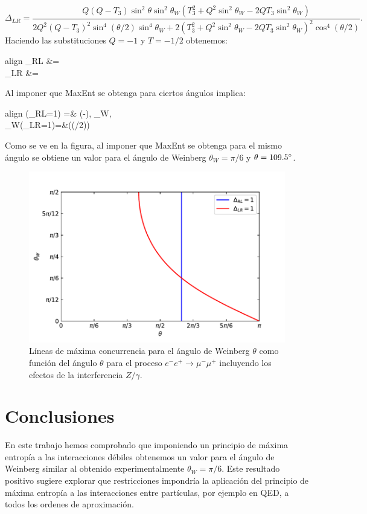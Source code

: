 \documentclass{article}
\theoremstyle{plain}
\theoremstyle{definition}
\begin{document}
	\[\Delta_{LR}=\frac{Q(Q-T_3)\sin^2\theta\sin^2\theta_W\left(T_3^2+Q^2\sin^2\theta_W-2QT_3\sin^2\theta_W\right)}{2Q^2(Q-T_3)^2\sin^4(\theta/2)\sin^4\theta_W + 2\left(T_3^2+Q^2\sin^2\theta_W-2QT_3\sin^2\theta_W\right)^2\cos^4(\theta/2)} \text{.} \]
	Haciendo las substituciones \(Q=-1\) y \(T=-1/2\) obtenemos:
	\begin{empheq}{align}
	\Delta_{RL} &= \nonumber\\
	\Delta_{LR} &= \nonumber
	\end{empheq}

	Al imponer que MaxEnt se obtenga para ciertos ángulos implica:
	\begin{empheq}{align}
	\theta(\Delta_{RL}=1) =& \arccos\left(-\right), \forall \theta_W, \\
\theta_W(\Delta_{LR}=1)=&\arcsin\left(\cot(\theta/2)\right)
	\end{empheq}
	
	Como se ve en la figura, al imponer que MaxEnt se obtenga para el mismo ángulo se obtiene un valor para el ángulo de Weinberg \(\theta_W = \pi/6 \) y \(\theta=109.5\degree \).
	\begin{figure}[h]
		\centering
		\includegraphics[width=0.85\linewidth]{concurrence.pdf}
		\caption{Líneas de máxima concurrencia para el ángulo de Weinberg \(\theta\) como función del ángulo \(\theta\) para el proceso \(e^-e^+\rightarrow\mu^-\mu^+\) incluyendo los efectos de la interferencia \(Z/\gamma\).} 
	\end{figure}
	
	\section{Conclusiones}
	En este trabajo hemos comprobado que imponiendo un principio de máxima entropía a las interacciones débiles obtenemos un valor para el ángulo de Weinberg similar al obtenido experimentalmente \(\theta_W = \pi / 6 \).  Este resultado positivo sugiere explorar que restricciones impondría la aplicación del principio de máxima entropía a las interacciones entre partículas, por ejemplo en QED, a todos los ordenes de aproximación.

	{}
		
\end{document}
